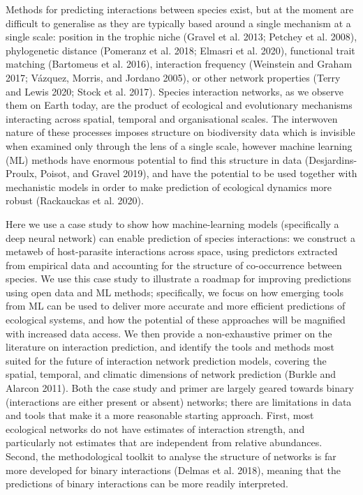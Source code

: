 \documentclass[11pt]{article}
\begin{document}
Methods for predicting interactions between species exist, but at the
moment are difficult to generalise as they are typically based around a
single mechanism at a single scale: position in the trophic niche
(Gravel et al. 2013; Petchey et al. 2008), phylogenetic distance
(Pomeranz et al. 2018; Elmasri et al. 2020), functional trait matching
(Bartomeus et al. 2016), interaction frequency (Weinstein and Graham
2017; Vázquez, Morris, and Jordano 2005), or other network properties
(Terry and Lewis 2020; Stock et al. 2017). Species interaction networks,
as we observe them on Earth today, are the product of ecological and
evolutionary mechanisms interacting across spatial, temporal and
organisational scales. The interwoven nature of these processes imposes
structure on biodiversity data which is invisible when examined only
through the lens of a single scale, however machine learning (ML)
methods have enormous potential to find this structure in data
(Desjardins-Proulx, Poisot, and Gravel 2019), and have the potential to
be used together with mechanistic models in order to make prediction of
ecological dynamics more robust (Rackauckas et al. 2020).

Here we use a case study to show how machine-learning models
(specifically a deep neural network) can enable prediction of species
interactions: we construct a metaweb of host-parasite interactions
across space, using predictors extracted from empirical data and
accounting for the structure of co-occurrence between species. We use
this case study to illustrate a roadmap for improving predictions using
open data and ML methods; specifically, we focus on how emerging tools
from ML can be used to deliver more accurate and more efficient
predictions of ecological systems, and how the potential of these
approaches will be magnified with increased data access. We then provide
a non-exhaustive primer on the literature on interaction prediction, and
identify the tools and methods most suited for the future of interaction
network prediction models, covering the spatial, temporal, and climatic
dimensions of network prediction (Burkle and Alarcon 2011). Both the
case study and primer are largely geared towards binary (interactions
are either present or absent) networks; there are limitations in data
and tools that make it a more reasonable starting approach. First, most
ecological networks do not have estimates of interaction strength, and
particularly not estimates that are independent from relative
abundances. Second, the methodological toolkit to analyse the structure
of networks is far more developed for binary interactions (Delmas et al.
2018), meaning that the predictions of binary interactions can be more
readily interpreted.
\end{document}
